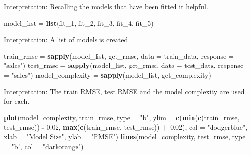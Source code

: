 \documentclass[]{report}
\newenvironment{Shaded}{\begin{snugshade}}{\end{snugshade}}
\newcommand{\KeywordTok}[1]{\textcolor[rgb]{0.13,0.29,0.53}{\textbf{#1}}}
\newcommand{\DataTypeTok}[1]{\textcolor[rgb]{0.13,0.29,0.53}{#1}}
\newcommand{\DecValTok}[1]{\textcolor[rgb]{0.00,0.00,0.81}{#1}}
\newcommand{\FloatTok}[1]{\textcolor[rgb]{0.00,0.00,0.81}{#1}}
\newcommand{\StringTok}[1]{\textcolor[rgb]{0.31,0.60,0.02}{#1}}
\newcommand{\OperatorTok}[1]{\textcolor[rgb]{0.81,0.36,0.00}{\textbf{#1}}}
\newcommand{\NormalTok}[1]{#1}
\begin{document}
Interpretation: Recalling the models that have been fitted it helpful.

\begin{Shaded}
\begin{Highlighting}[]
\NormalTok{model_list =}\StringTok{ }\KeywordTok{list}\NormalTok{(fit_}\DecValTok{1}\NormalTok{, fit_}\DecValTok{2}\NormalTok{, fit_}\DecValTok{3}\NormalTok{, fit_}\DecValTok{4}\NormalTok{, fit_}\DecValTok{5}\NormalTok{)}
\end{Highlighting}
\end{Shaded}

Interpretation: A list of models is created

\begin{Shaded}
\begin{Highlighting}[]
\NormalTok{train_rmse =}\StringTok{ }\KeywordTok{sapply}\NormalTok{(model_list, get_rmse, }\DataTypeTok{data =}\NormalTok{ train_data, }\DataTypeTok{response =} \StringTok{"sales"}\NormalTok{)}
\NormalTok{test_rmse =}\StringTok{ }\KeywordTok{sapply}\NormalTok{(model_list, get_rmse, }\DataTypeTok{data =}\NormalTok{ test_data, }\DataTypeTok{response =} \StringTok{"sales"}\NormalTok{)}
\NormalTok{model_complexity =}\StringTok{ }\KeywordTok{sapply}\NormalTok{(model_list, get_complexity)}
\end{Highlighting}
\end{Shaded}

Interpretation: The train RMSE, test RMSE and the model complexity are
used for each.

\begin{Shaded}
\begin{Highlighting}[]
\KeywordTok{plot}\NormalTok{(model_complexity, train_rmse, }\DataTypeTok{type =} \StringTok{"b"}\NormalTok{, }
     \DataTypeTok{ylim =} \KeywordTok{c}\NormalTok{(}\KeywordTok{min}\NormalTok{(}\KeywordTok{c}\NormalTok{(train_rmse, test_rmse)) }\OperatorTok{-}\StringTok{ }\FloatTok{0.02}\NormalTok{, }
              \KeywordTok{max}\NormalTok{(}\KeywordTok{c}\NormalTok{(train_rmse, test_rmse)) }\OperatorTok{+}\StringTok{ }\FloatTok{0.02}\NormalTok{), }
     \DataTypeTok{col =} \StringTok{"dodgerblue"}\NormalTok{, }
     \DataTypeTok{xlab =} \StringTok{"Model Size"}\NormalTok{,}
     \DataTypeTok{ylab =} \StringTok{"RMSE"}\NormalTok{)}
\KeywordTok{lines}\NormalTok{(model_complexity, test_rmse, }\DataTypeTok{type =} \StringTok{"b"}\NormalTok{, }\DataTypeTok{col =} \StringTok{"darkorange"}\NormalTok{)}
\end{Highlighting}
\end{Shaded}
\end{document}
